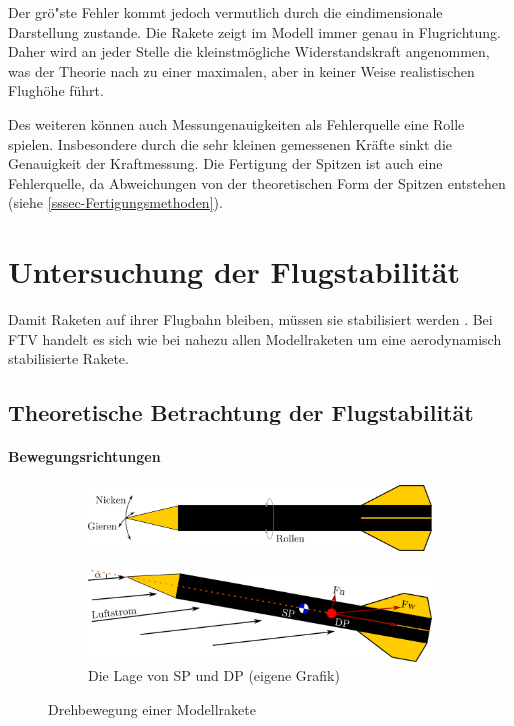 \documentclass[10pt,a4paper]{article}
\begin{document}
Der grö"ste Fehler kommt jedoch vermutlich durch die eindimensionale Darstellung zustande. Die Rakete zeigt im Modell immer genau in Flugrichtung. Daher wird an jeder Stelle die kleinstmögliche Widerstandskraft angenommen, was der Theorie nach zu einer maximalen, aber in keiner Weise realistischen Flughöhe führt. 

Des weiteren können auch Messungenauigkeiten als Fehlerquelle eine Rolle spielen. Insbesondere durch die sehr kleinen gemessenen Kräfte sinkt die Genauigkeit der Kraftmessung. Die Fertigung der Spitzen ist auch eine Fehlerquelle, da Abweichungen von der theoretischen Form der Spitzen entstehen (siehe \ref{sssec-Fertigungsmethoden}).



\section{Untersuchung der Flugstabilität}

Damit Raketen auf ihrer Flugbahn bleiben, müssen sie stabilisiert werden \cite{dl}. Bei FTV handelt es sich wie bei nahezu allen Modellraketen um eine aerodynamisch stabilisierte Rakete.


\subsection{Theoretische Betrachtung der Flugstabilität}
\label{ssec-Theoretische-Btrachtung-Flugstabilität}

\paragraph{Bewegungsrichtungen}

\begin{figure}[h]
\begin{subfigure}[l]{0.49\textwidth}
	\centering
	\includegraphics[width=\textwidth]{Bilder/Freiheitsgrade.png}
	\label{sfig-Freihetsgrade}
\end{subfigure}
\begin{subfigure}[l]{0.49\textwidth}
	\centering
	\includegraphics[width=\textwidth]{Bilder/Lage-DP-SP.png}
	\caption{Die Lage von SP und DP (eigene Grafik)}
	\label{sfig-Lage-DP-SP}
\end{subfigure}
\caption{Drehbewegung einer Modellrakete}
\end{figure}
\end{document}
